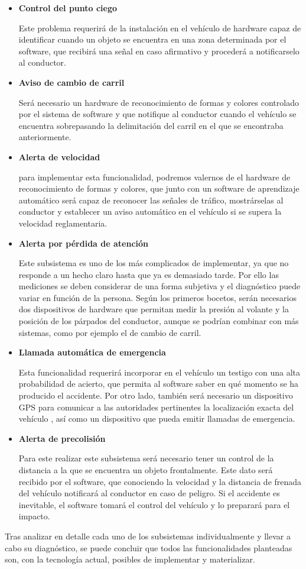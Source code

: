 \documentclass[10pt,a4paper,oldfontcommands]{dpds}
\begin{document}
\begin{itemize}[-]
\item \textbf{Control del punto ciego}
\par Este problema requerirá de la instalación en el vehículo de hardware capaz de identificar cuando un objeto se encuentra en una zona determinada por el software, que recibirá una señal en caso afirmativo y procederá a notificarselo al conductor.

\item \textbf{Aviso de cambio de carril}
\par Será necesario un hardware de reconocimiento de formas y colores controlado por el sistema de software y que notifique al conductor cuando el vehículo se encuentra sobrepasando la delimitación del carril en el que se encontraba anteriormente.

\item \textbf{Alerta de velocidad}
\par para implementar esta funcionalidad, podremos valernos de el hardware de reconocimiento de formas y colores, que junto con un software de aprendizaje automático será capaz de reconocer las señales de tráfico, mostrárselas al conductor y establecer un aviso automático en el vehículo si se supera la velocidad reglamentaria.

\item \textbf{Alerta por pérdida de atención}
\par Este subsistema es uno de los más complicados de implementar, ya que no responde a un hecho claro hasta que ya es demasiado tarde. Por ello las mediciones se deben considerar de una forma subjetiva y el diagnóstico puede variar en función de la persona. Según los primeros bocetos, serán necesarios dos dispositivos de hardware que permitan medir la presión al volante y la posición de los párpados del conductor, aunque se podrían combinar con más sistemas, como por ejemplo el de cambio de carril.

\item \textbf{Llamada automática de emergencia}
\par Esta funcionalidad requerirá incorporar en el vehículo un testigo con una alta probabilidad de acierto, que permita al software saber en qué momento se ha producido el accidente. Por otro lado, también será necesario un dispositivo GPS para comunicar a las autoridades pertinentes la localización exacta del vehículo , así como un dispositivo que pueda emitir llamadas de emergencia.

\item \textbf{Alerta de precolisión}
\par Para este realizar este subsistema será necesario tener un control de la distancia a la que se encuentra un objeto frontalmente. Este dato será recibido por el software, que conociendo la velocidad y la distancia de frenada del vehículo notificará al conductor en caso de peligro. Si el accidente es inevitable, el software tomará el control del vehículo y lo preparará para el impacto.

\end{itemize}

\par Tras analizar en detalle cada uno de los subsistemas individualmente y llevar a cabo su diagnóstico, se puede concluir que todos las funcionalidades planteadas son, con la tecnología actual, posibles de implementar y materializar.
\end{document}

